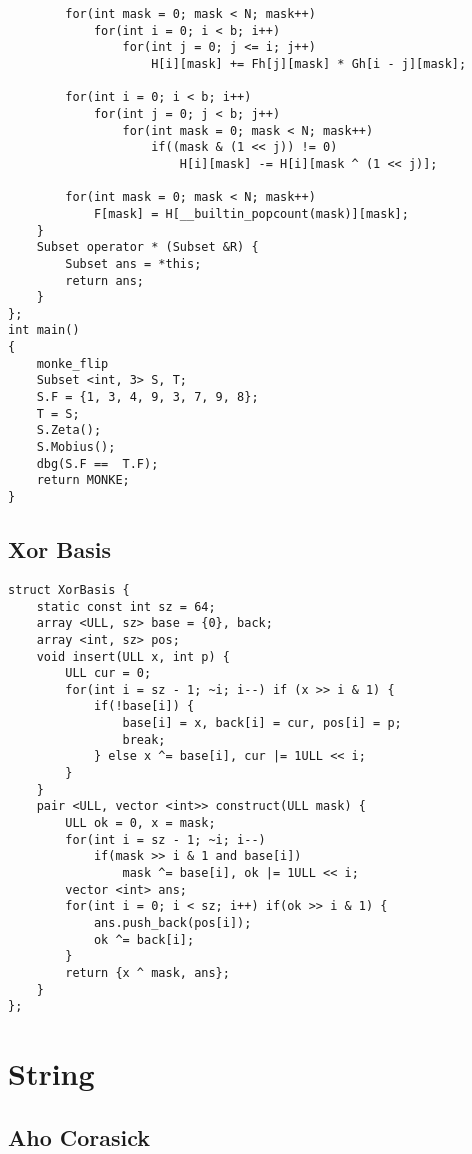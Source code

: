 \documentclass[FSZ,a4paper,onesided]{article}
\begin{document}
\begin{multicols*}{\COLS}
\begin{lstlisting}
        for(int mask = 0; mask < N; mask++)
            for(int i = 0; i < b; i++)
                for(int j = 0; j <= i; j++)
                    H[i][mask] += Fh[j][mask] * Gh[i - j][mask];

        for(int i = 0; i < b; i++) 
            for(int j = 0; j < b; j++) 
                for(int mask = 0; mask < N; mask++) 
                    if((mask & (1 << j)) != 0) 
                        H[i][mask] -= H[i][mask ^ (1 << j)];
                
        for(int mask = 0; mask < N; mask++)  
            F[mask] = H[__builtin_popcount(mask)][mask];
    }
    Subset operator * (Subset &R) {
        Subset ans = *this;
        return ans;
    }
};
int main()
{
    monke_flip
    Subset <int, 3> S, T;
    S.F = {1, 3, 4, 9, 3, 7, 9, 8};
    T = S;
    S.Zeta();
    S.Mobius();
    dbg(S.F ==  T.F);
    return MONKE;
}
\end{lstlisting}
\subsection{Xor Basis}
\begin{lstlisting}
struct XorBasis {
    static const int sz = 64;
    array <ULL, sz> base = {0}, back;
    array <int, sz> pos;
    void insert(ULL x, int p) {
        ULL cur = 0;
        for(int i = sz - 1; ~i; i--) if (x >> i & 1) {
            if(!base[i]) {
                base[i] = x, back[i] = cur, pos[i] = p;
                break;
            } else x ^= base[i], cur |= 1ULL << i;
        }
    }
    pair <ULL, vector <int>> construct(ULL mask) {
        ULL ok = 0, x = mask;
        for(int i = sz - 1; ~i; i--)  
            if(mask >> i & 1 and base[i])
                mask ^= base[i], ok |= 1ULL << i;
        vector <int> ans;
        for(int i = 0; i < sz; i++) if(ok >> i & 1) {
            ans.push_back(pos[i]);
            ok ^= back[i];
        }
        return {x ^ mask, ans};
    } 
};\end{lstlisting}
\section{String}
\subsection{Aho Corasick}
\begin{lstlisting}


\end{lstlisting}
\end{multicols*}
\end{document}

